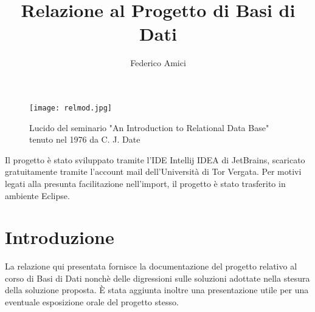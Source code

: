 \documentclass[12pt,a4paper,onecolumn,x11names]{article}
\title{Relazione al Progetto di Basi di Dati}
\author{Federico Amici}
\begin{document}
	
\begin{titlepage}
\maketitle

	\vspace{3cm}
	\begin{center}
		\begin{figure}[h]
			\texttt{[image: relmod.jpg]}
			\caption{Lucido del seminario "An Introduction to Relational Data Base" tenuto nel 1976 da C. J. Date}
		\end{figure}
	\end{center}
		
\newpage
\end{titlepage}

\tableofcontents
\listoftables
\listoffigures
\vspace{50mm}
\begin{flushleft}
	Il progetto è stato sviluppato tramite l'IDE Intellij IDEA di JetBrains, scaricato gratuitamente tramite l'account mail dell'Università di Tor Vergata. Per motivi legati alla presunta facilitazione nell'import, il progetto è stato trasferito in ambiente Eclipse.
\end{flushleft}

\newpage

\section{Introduzione}
		La relazione qui presentata fornisce la documentazione del progetto relativo al corso di Basi di Dati nonchè delle digressioni sulle soluzioni adottate nella stesura della soluzione proposta. È stata aggiunta inoltre una presentazione utile per una eventuale esposizione orale del progetto stesso.\newline
				
\end{document}
